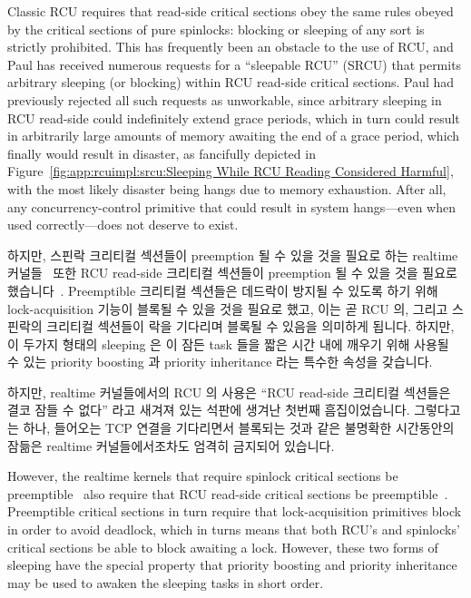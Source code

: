 Classic RCU requires that read-side critical sections
obey the same rules
obeyed by the critical sections of pure spinlocks: blocking or sleeping
of any sort is strictly prohibited.
This has frequently been an obstacle to the use of RCU, and
Paul has received numerous requests for a ``sleepable RCU'' (SRCU) that
permits arbitrary sleeping (or blocking) within RCU read-side critical
sections.
Paul had previously rejected all such requests as unworkable, since arbitrary
sleeping in RCU read-side could indefinitely extend grace periods, which
in turn could result in arbitrarily large amounts of memory awaiting the
end of a grace period, which finally would result in disaster,
as fancifully depicted in
Figure~\ref{fig:app:rcuimpl:srcu:Sleeping While RCU Reading Considered Harmful},
with the most likely disaster being hangs due to memory exhaustion.
After all, any concurrency-control primitive that could result in
system hangs---even when used correctly---does not deserve to exist.
\fi

하지만, 스핀락 크리티컬 섹션들이 preemption 될 수 있을 것을 필요로 하는
realtime 커널들~\cite{IngoMolnar05a} 또한 RCU read-side 크리티컬 섹션들이
preemption 될 수 있을 것을 필요로 했습니다~\cite{PaulMcKenney05b}.
Preemptible 크리티컬 섹션들은 데드락이 방지될 수 있도록 하기 위해
lock-acquisition 기능이 블록될 수 있을 것을 필요로 했고, 이는 곧 RCU 의, 그리고
스핀락의 크리티컬 섹션들이 락을 기다리며 블록될 수 있음을 의미하게 됩니다.
하지만, 이 두가지 형태의 sleeping 은 이 잠든 task 들을 짧은 시간 내에 깨우기
위해 사용될 수 있는 priority boosting 과 priority inheritance 라는 특수한
속성을 갖습니다.

하지만, realtime 커널들에서의 RCU 의 사용은 ``RCU read-side 크리티컬 섹션들은
결코 잠들 수 없다'' 라고 새겨져 있는 석판에 생겨난 첫번째 흠집이었습니다.
그렇다고는 하나, 들어오는 TCP 연결을 기다리면서 블록되는 것과 같은 불명확한
시간동안의 잠듦은 realtime 커널들에서조차도 엄격히 금지되어 있습니다.
\iffalse

However, the realtime kernels that require spinlock critical sections
be preemptible~\cite{IngoMolnar05a} also require that RCU read-side critical
sections be preemptible~\cite{PaulMcKenney05b}.
Preemptible critical sections in turn require that lock-acquisition
primitives block in order to avoid deadlock,
which in turns means that both RCU's and spinlocks'
critical sections be able to block awaiting a lock.
However, these two forms of sleeping have the special property that
priority boosting and priority inheritance may be used to awaken
the sleeping tasks in short order.


